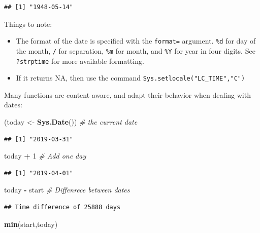 \documentclass[]{book}
\newenvironment{Shaded}{\begin{snugshade}}{\end{snugshade}}
\newcommand{\CommentTok}[1]{\textcolor[rgb]{0.56,0.35,0.01}{\textit{#1}}}
\newcommand{\DecValTok}[1]{\textcolor[rgb]{0.00,0.00,0.81}{#1}}
\newcommand{\KeywordTok}[1]{\textcolor[rgb]{0.13,0.29,0.53}{\textbf{#1}}}
\newcommand{\NormalTok}[1]{#1}
\newcommand{\OperatorTok}[1]{\textcolor[rgb]{0.81,0.36,0.00}{\textbf{#1}}}
\newcommand{\StringTok}[1]{\textcolor[rgb]{0.31,0.60,0.02}{#1}}
\providecommand{\tightlist}{%
  \setlength{\itemsep}{0pt}\setlength{\parskip}{0pt}}
\theoremstyle{definition}
\theoremstyle{definition}
\theoremstyle{definition}
\theoremstyle{remark}
\begin{document}
\begin{verbatim}
## [1] "1948-05-14"
\end{verbatim}

Things to note:

\begin{itemize}
\tightlist
\item
  The format of the date is specified with the \texttt{format=} argument.
  \texttt{\%d} for day of the month, \texttt{/} for separation, \texttt{\%m} for month, and \texttt{\%Y} for year in four digits. See \texttt{?strptime} for more available formatting.
\item
  If it returns NA, then use the command \texttt{Sys.setlocale("LC\_TIME","C")}
\end{itemize}

Many functions are content aware, and adapt their behavior when dealing with dates:

\begin{Shaded}
\begin{Highlighting}[]
\NormalTok{(today <-}\StringTok{ }\KeywordTok{Sys.Date}\NormalTok{()) }\CommentTok{# the current date}
\end{Highlighting}
\end{Shaded}

\begin{verbatim}
## [1] "2019-03-31"
\end{verbatim}

\begin{Shaded}
\begin{Highlighting}[]
\NormalTok{today }\OperatorTok{+}\StringTok{ }\DecValTok{1} \CommentTok{# Add one day}
\end{Highlighting}
\end{Shaded}

\begin{verbatim}
## [1] "2019-04-01"
\end{verbatim}

\begin{Shaded}
\begin{Highlighting}[]
\NormalTok{today }\OperatorTok{-}\StringTok{ }\NormalTok{start }\CommentTok{# Diffenrece between dates}
\end{Highlighting}
\end{Shaded}

\begin{verbatim}
## Time difference of 25888 days
\end{verbatim}

\begin{Shaded}
\begin{Highlighting}[]
\KeywordTok{min}\NormalTok{(start,today)}
\end{Highlighting}
\end{Shaded}
\end{document}
